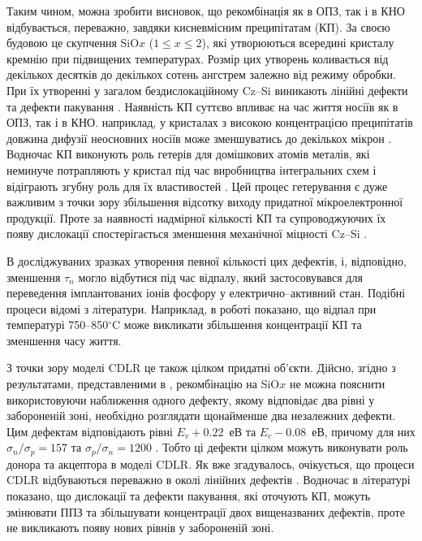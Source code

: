Таким чином, можна зробити висновок, що рекомбінація як в ОПЗ, так і в КНО відбувається, переважно,
завдяки кисневмісним преципітатам (КП).
За своєю будовою  це скупчення SiO$x$ ($1\leq x\leq2$), які утворюються всередині кристалу кремнію при підвищених температурах.
Розмір цих утворень коливається від декількох десятків до декількох сотень ангстрем залежно від режиму обробки.
При їх утворенні у загалом бездислокаційному Cz--Si виникають лінійні дефекти та дефекти пакування \cite{SiO:Hwang,SiO:Vanhell}.
Наявність КП суттєво впливає на час життя носіїв як в ОПЗ, так і в КНО.
наприклад, у кристалах з високою концентрацією преципітатів довжина дифузії неосновних носіїв може зменшуватись до декількох мікрон \cite{SiO:Hwang}.
Водночас КП виконують роль гетерів для домішкових атомів металів, які неминуче потрапляють у кристал під час виробництва
інтегральних схем і відіграють згубну роль для їх властивостей \cite{APR:Oxigen,MSER74}.
Цей процес гетерування є дуже важливим з точки зору збільшення відсотку виходу придатної мікроелектронної продукції.
Проте за наявності надмірної кількості КП та супроводжуючих їх появу дислокації
спостерігається зменшення механічної міцності Cz--Si \cite{MSER74}.


В досліджуваних зразках утворення певної кількості цих дефектів, і, відповідно, зменшення $\tau _n$ могло відбутися під час відпалу,
який застосовувався для переведення імплантованих іонів фосфору у електрично--активний стан.
Подібні процеси відомі з літератури.
Наприклад, в роботі \cite{SiO:Miyagi} показано, що відпал при температурі 750--850$^\circ$C
може викликати збільшення концентрації КП та зменшення часу життя.

З точки зору моделі CDLR це також цілком придатні об'єкти.
Дійсно, згідно з результатами, представленими в \cite{MurphySC2014,MurphyJAP2012},
рекомбінацію на SiO$x$ не можна пояснити використовуючи наближення одного дефекту, якому відповідає два рівні у забороненій зоні,
необхідно розглядати щонайменше два незалежних дефекти.
Цим дефектам відповідають рівні $E_v+0.22$~еВ та $E_c-0.08$~еВ, причому для них $\sigma_n/\sigma_p=157$ та $\sigma_p/\sigma_n=1200$ \cite{MurphyJAP2012}.
Тобто ці дефекти цілком можуть виконувати роль донора та акцептора в моделі CDLR.
Як вже згадувалось, очікується, що процеси CDLR відбуваються переважно в околі лінійних дефектів \cite{CDLR:JAP,CDLR:SSP}.
Водночас в літературі \cite{MurphySC2014,MurphyJAP2011,MurphyJAP2012} показано, що дислокації та дефекти пакування,
які оточують КП, можуть змінювати ППЗ та збільшувати концентрації двох вищеназваних дефектів,
проте не викликають появу  нових рівнів у забороненій зоні.

